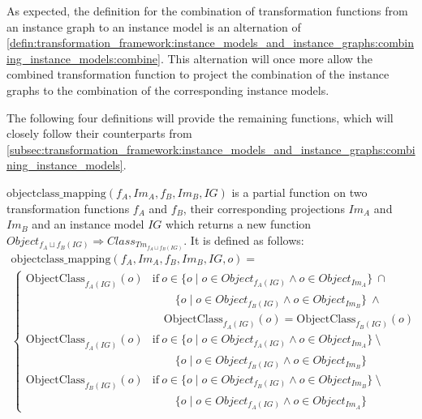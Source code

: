 As expected, the definition for the combination of transformation functions from an instance graph to an instance model is an alternation of \cref{defin:transformation_framework:instance_models_and_instance_graphs:combining_instance_models:combine}. This alternation will once more allow the combined transformation function to project the combination of the instance graphs to the combination of the corresponding instance models.

The following four definitions will provide the remaining functions, which will closely follow their counterparts from \cref{subsec:transformation_framework:instance_models_and_instance_graphs:combining_instance_models}.

\begin{defin}
\label{defin:transformation_framework:instance_models_and_instance_graphs:combining_transformation_functions:objectclass_mapping}
$\mathrm{objectclass\_\!mapping}(f_A, Im_A, f_B, Im_B, IG)$ is a partial function on two transformation functions $f_A$ and $f_B$, their corresponding projections $Im_A$ and $Im_B$ and an instance model $IG$ which returns a new function $Object_{f_{A} \sqcup f_{B}(IG)} \Rightarrow Class_{Tm_{f_{A} \sqcup f_{B}(IG)}}$. It is defined as follows:
\begin{multline*}
    \mathrm{objectclass\_\!mapping}(f_A, Im_A, f_B, Im_B, IG, o) = \\
    \begin{cases}
        \mathrm{ObjectClass}_{f_{A}(IG)}(o) & \mathrm{if }\ o \in \{o \mid o \in Object_{f_{A}(IG)} \land o \in Object_{Im_A} \}\ \cap \\&\qquad\{o \mid o \in Object_{f_{B}(IG)} \land o \in Object_{Im_B} \}\ \land \\&\quad \mathrm{ObjectClass}_{f_{A}(IG)}(o) = \mathrm{ObjectClass}_{f_{B}(IG)}(o) \\
        \mathrm{ObjectClass}_{f_{A}(IG)}(o) & \mathrm{if }\ o \in \{o \mid o \in Object_{f_{A}(IG)} \land o \in Object_{Im_A} \}\ \setminus \\&\qquad\{o \mid o \in Object_{f_{B}(IG)} \land o \in Object_{Im_B} \} \\
        \mathrm{ObjectClass}_{f_{B}(IG)}(o) & \mathrm{if }\ o \in \{o \mid o \in Object_{f_{B}(IG)} \land o \in Object_{Im_B} \}\ \setminus \\&\qquad\{o \mid o \in Object_{f_{A}(IG)} \land o \in Object_{Im_A} \}
    \end{cases}
\end{multline*}
\end{defin}

